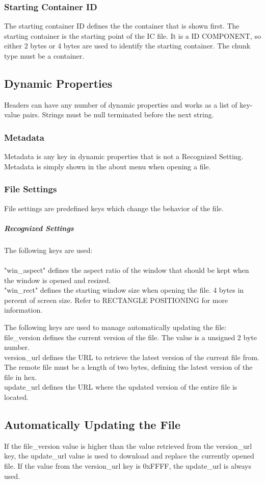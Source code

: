 \documentclass{report}
\begin{document}
\subsubsection{Starting Container ID}
The starting container ID defines the the container that is shown first. The starting container is the starting point of the IC file. It is a ID COMPONENT, so either 2 bytes or 4 bytes are used to identify the starting container. The chunk type must be a container.

\subsection{Dynamic Properties}
Headers can have any number of dynamic properties and works as a list of key-value pairs. Strings must be null terminated before the next string.
\subsubsection{Metadata}
Metadata is any key in dynamic properties that is not a Recognized Setting. Metadata is simply shown in the about menu when opening a file.
\subsubsection{File Settings}
File settings are predefined keys which change the behavior of the file. 
\subparagraph{Recognized Settings}
The following keys are used:\\
\\
"win\_aspect" defines the aspect ratio of the window that should be kept when the window is opened and resized.\\
"win\_rect" defines the starting window size when opening the file. 4 bytes in percent of screen size. Refer to RECTANGLE POSITIONING for more information.

The following keys are used to manage automatically updating the file:\\
file\_version defines the current version of the file. The value is a unsigned 2 byte number.\\
version\_url defines the URL to retrieve the latest version of the current file from. The remote file must be a length of two bytes, defining the latest version of the file in hex.\\
update\_url defines the URL where the updated version of the entire file is located.


\subsection{Automatically Updating the File}
If the file\_version value is higher than the value retrieved from the version\_url key, the update\_url value is used to download and replace the currently opened file. If the value from the version\_url key is 0xFFFF, the update\_url is always used.
\end{document}

